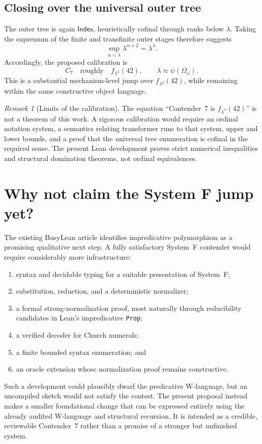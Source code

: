 \documentclass[11pt]{article}
\theoremstyle{definition}
\theoremstyle{remark}
\newtheorem{remark}[theorem]{Remark}
\newcommand{\Index}{\mathsf{Index}}
\newcommand{\lean}[1]{\texttt{#1}}
\begin{document}
\subsection{Closing over the universal outer tree}

The outer tree is again \(\Index\), heuristically cofinal through ranks below
\(\lambda\).  Taking the supremum of the finite and transfinite outer stages
therefore suggests
\[
  \sup_{\alpha<\lambda}\lambda^{\alpha+2}
  =\lambda^\lambda.
\]
Accordingly, the proposed calibration is
\[
  C_7\quad\text{roughly}\quad f_{\lambda^\lambda}(42),
  \qquad \lambda\approx\psi(\Omega_\omega).
\]
This is a substantial mechanism-level jump over \(f_{\lambda^2}(42)\), while
remaining within the same constructive object language.

\begin{remark}[Limits of the calibration]
The equation ``Contender~7 is \(f_{\lambda^\lambda}(42)\)'' is not a theorem of
this work.  A rigorous calibration would require an ordinal notation system,
a semantics relating transformer runs to that system, upper and lower bounds,
and a proof that the universal tree enumeration is cofinal in the required
sense.  The present Lean development proves strict numerical inequalities and
structural domination theorems, not ordinal equivalences.
\end{remark}

\section{Why not claim the System F jump yet?}
\label{sec:systemf}

The existing BusyLean article identifies impredicative polymorphism as a
promising qualitative next step.  A fully satisfactory System~F contender
would require considerably more infrastructure:
\begin{enumerate}[leftmargin=*]
  \item syntax and decidable typing for a suitable presentation of System~F;
  \item substitution, reduction, and a deterministic normalizer;
  \item a formal strong-normalization proof, most naturally through
        reducibility candidates in Lean's impredicative \lean{Prop};
  \item a verified decoder for Church numerals;
  \item a finite bounded syntax enumeration; and
  \item an oracle extension whose normalization proof remains constructive.
\end{enumerate}
Such a development could plausibly dwarf the predicative W-language, but an
uncompiled sketch would not satisfy the contest.  The present proposal instead
makes a smaller foundational change that can be expressed entirely using the
already audited W-language and structural recursion.  It is intended as a
credible, reviewable Contender~7 rather than a promise of a stronger but
unfinished system.
\end{document}
